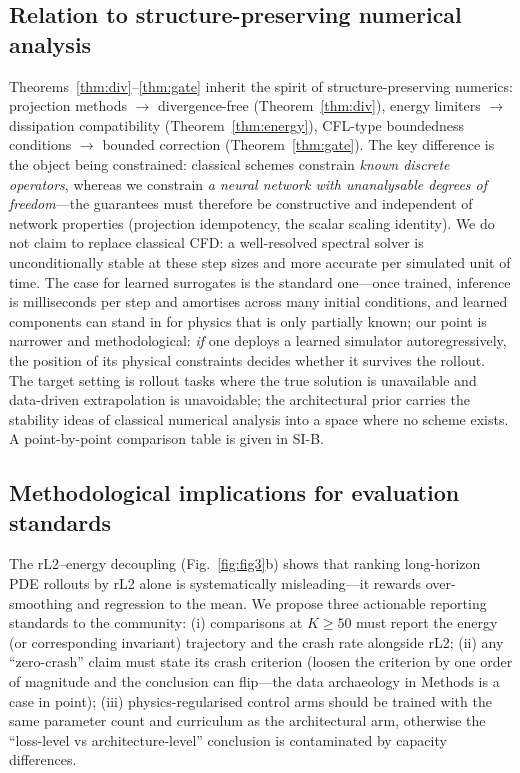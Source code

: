 \documentclass[11pt,a4paper]{article}
\begin{document}
\subsection{Relation to structure-preserving numerical analysis}

Theorems~\ref{thm:div}--\ref{thm:gate} inherit the spirit of structure-preserving numerics: projection methods $\to$ divergence-free (Theorem~\ref{thm:div}), energy limiters $\to$ dissipation compatibility (Theorem~\ref{thm:energy}), CFL-type boundedness conditions $\to$ bounded correction (Theorem~\ref{thm:gate}). The key difference is the object being constrained: classical schemes constrain \emph{known discrete operators}, whereas we constrain \emph{a neural network with unanalysable degrees of freedom}---the guarantees must therefore be constructive and independent of network properties (projection idempotency, the scalar scaling identity). We do not claim to replace classical CFD: a well-resolved spectral solver is unconditionally stable at these step sizes and more accurate per simulated unit of time. The case for learned surrogates is the standard one---once trained, inference is milliseconds per step and amortises across many initial conditions, and learned components can stand in for physics that is only partially known; our point is narrower and methodological: \emph{if} one deploys a learned simulator autoregressively, the position of its physical constraints decides whether it survives the rollout. The target setting is rollout tasks where the true solution is unavailable and data-driven extrapolation is unavoidable; the architectural prior carries the stability ideas of classical numerical analysis into a space where no scheme exists. A point-by-point comparison table is given in SI-B.

\subsection{Methodological implications for evaluation standards}

The rL2--energy decoupling (Fig.~\ref{fig:fig3}b) shows that ranking long-horizon PDE rollouts by rL2 alone is systematically misleading---it rewards over-smoothing and regression to the mean. We propose three actionable reporting standards to the community: (i) comparisons at $K\ge50$ must report the energy (or corresponding invariant) trajectory and the crash rate alongside rL2; (ii) any ``zero-crash'' claim must state its crash criterion (loosen the criterion by one order of magnitude and the conclusion can flip---the data archaeology in Methods is a case in point); (iii) physics-regularised control arms should be trained with the same parameter count and curriculum as the architectural arm, otherwise the ``loss-level vs architecture-level'' conclusion is contaminated by capacity differences.
\end{document}
